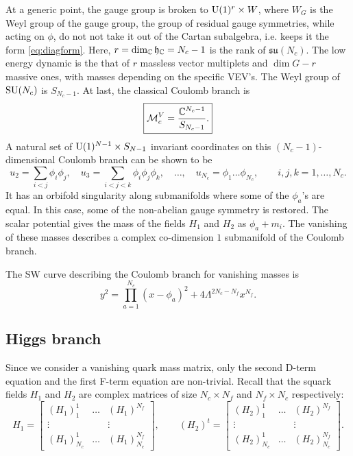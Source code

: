         At a generic point, the gauge group is broken to $\text{U}(1)^r\times W$, where $W_G$ is the Weyl group of the gauge group, the group of residual gauge symmetries, while acting on $\phi$, do not not take it out of the Cartan subalgebra, i.e. keeps it the form \eqref{eq:diagform}. Here, $r=\dim_{\mathbb{C}}\mathfrak{h}_{\mathbb{C}}=N_c-1$ is the rank of $\mathfrak{su}(N_c)$. The low energy dynamic is the that of $r$ massless vector multiplets and $\dim G-r$ massive ones, with masses depending on the specific VEV's. The Weyl group of $\text{SU}(N_c)$ is $S_{N_c-1}$. At last, the classical Coulomb branch is
        \begin{equation}
            \boxed{\mathcal{M}^V_c=\frac{\mathbb{C}^{N_c-1}}{S_{N_c-1}}.}
        \end{equation}
        A natural set of $\text{U}(1)^{N-1}\times S_{N-1}$ invariant coordinates on this $(N_c-1)$-dimensional Coulomb branch can be shown to be
        \begin{equation}
            u_2=\sum_{i<j}\phi_i\phi_j,\quad u_3=\sum_{i<j<k}\phi_i\phi_j\phi_k,\quad \dots,\quad u_{N_c}=\phi_1\dots \phi_{N_c}, \qquad i,j,k=1,\dots,N_c.
        \end{equation}
        It has an orbifold singularity along submanifolds where some of the $\phi_a$'s are equal. In this case, some of the non-abelian gauge symmetry is restored. The scalar potential gives the mass of the fields $H_1$ and $H_2$ as $\phi_a+m_i$. The vanishing of these masses describes a complex co-dimension $1$ submanifold of the Coulomb branch.

        The SW curve describing the Coulomb branch for vanishing masses is
        \begin{equation}
            y^2=\prod^{N_c}_{a=1}(x-\phi_a)^2+4\Lambda^{2N_c-N_f}x^{N_f}.\label{eq:SWcurveCoulombbranch}
        \end{equation}

    \subsection{Higgs branch}

        Since we consider a vanishing quark mass matrix, only the second D-term equation and the first F-term equation are non-trivial. Recall that the squark fields $H_1$ and $H_2$ are complex matrices of size $N_c\times N_f$ and $N_f\times N_c$ respectively:
        \begin{equation}
            H_1=
            \begin{bmatrix}
                (H_1)^1_1 & \dots & (H_1)^{N_f} \\
                \vdots & & \vdots \\
                (H_1)^1_{N_c} & \dots & (H_1)^{N_f}_{N_c}
            \end{bmatrix},\qquad
            (H_2)^t=
            \begin{bmatrix}
                (H_2)^1_1 & \dots & (H_2)^{N_f} \\
                \vdots & & \vdots \\
                (H_2)^1_{N_c} & \dots & (H_2)^{N_f}_{N_c}
            \end{bmatrix}.
        \end{equation}

